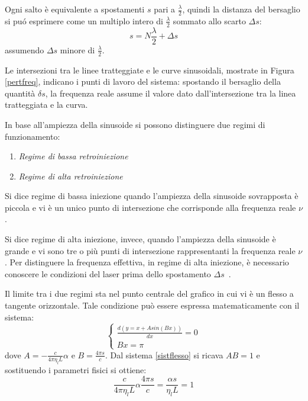 Ogni salto è equivalente a spostamenti $s$ pari a $\frac{\lambda}{2}$, quindi la distanza del bersaglio si puó esprimere come un multiplo intero di $\frac{\lambda}{2}$ sommato allo scarto $\Delta s$:
\begin{equation}
	s= N \frac{\lambda}{2} + \Delta s
\end{equation}
assumendo $\Delta s$ minore di $\frac{\lambda}{2}$.

Le intersezioni tra le linee tratteggiate e le curve sinusoidali, mostrate in Figura \ref{pertfreq}, indicano i punti di lavoro del sistema: spostando il bersaglio della quantità $\delta s$, la frequenza reale assume il valore dato dall'intersezione tra la linea tratteggiata e la curva.

In base all'ampiezza della sinusoide si possono distinguere due regimi di funzionamento:
\newpage
\begin{enumerate}
	\item \textit{Regime di bassa retroiniezione}
	\item \textit{Regime di alta retroiniezione}
\end{enumerate}

Si dice regime di bassa iniezione quando l'ampiezza della sinusoide sovrapposta è piccola e vi è un unico punto di intersezione che corrisponde alla frequenza reale $\nu$.

Si dice regime di alta iniezione, invece, quando l'ampiezza della sinusoide è grande e vi sono tre o più punti di intersezione rappresentanti la frequenza reale $\nu$. Per distinguere la frequenza effettiva, in regime di alta iniezione, è necessario conoscere le condizioni del laser prima dello spostamento $\Delta s$~\cite{randonethesis}.

Il limite tra i due regimi sta nel punto centrale del grafico in cui vi è un flesso a tangente orizzontale. Tale condizione può essere espressa matematicamente con il sistema:
\begin{equation}
	\begin{cases}
   \frac{d(y=x+Asin(Bx))}{dx}=0\\Bx=\pi
   \end{cases}
   \label{sistflesso}
\end{equation}
dove $A=- \frac{c}{4 \pi \eta_l L}\alpha$ e $B=\frac{4\pi s}{c}$. Dal sistema \ref{sistflesso} si ricava $AB=1$ e sostituendo i parametri fisici si ottiene:
\begin{equation}
	\frac{c}{4 \pi \eta_l L} \alpha \frac{4\pi s}{c} = \frac{\alpha s}{\eta_l L} = 1
\end{equation}

